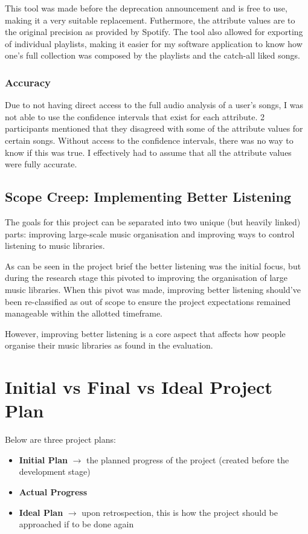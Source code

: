 This tool was made before the deprecation announcement and is free to use, making it a very suitable replacement. Futhermore, the attribute values are to the original precision as provided by Spotify. The tool also allowed for exporting of individual playlists, making it easier for my software application to know how one's full collection was composed by the playlists and the catch-all liked songs.

\subsubsection{Accuracy}%
Due to not having direct access to the full audio analysis of a user's songs, I was not able to use the confidence intervals that exist for each attribute. 2 participants mentioned that they disagreed with some of the attribute values for certain songs. Without access to the confidence intervals, there was no way to know if this was true. I effectively had to assume that all the attribute values were fully accurate.

\subsection{Scope Creep: Implementing Better Listening}%
The goals for this project can be separated into two unique (but heavily linked) parts: improving large-scale music organisation and improving ways to control listening to music libraries.

As can be seen in the project brief the better listening was the initial focus, but during the research stage this pivoted to improving the organisation of large music libraries. When this pivot was made, improving better listening should've been re-classified as out of scope to ensure the project expectations remained manageable within the allotted timeframe.

However, improving better listening is a core aspect that affects how people organise their music libraries as found in the evaluation.

\section{Initial vs Final vs Ideal Project Plan}
Below are three project plans:\begin{itemize}
    \item \textbf{Initial Plan} \(\to\) the planned progress of the project (created before the development stage)
    \item \textbf{Actual Progress}
    \item \textbf{Ideal Plan} \(\to\) upon retrospection, this is how the project should be approached if to be done again
\end{itemize}

